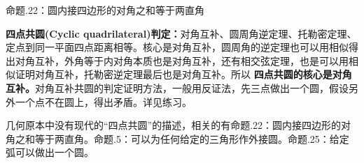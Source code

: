 \documentclass[../main.tex]{subfiles}
\begin{document}
命题\uppercase\expandafter{}.22：圆内接四边形的对角之和等于两直角

\textbf{四点共圆(Cyclic quadrilateral)判定：}对角互补、圆周角逆定理、托勒密定理、定点到同一平面四点距离相等。核心是对角互补，圆周角的逆定理也可以用相似得出对角互补，外角等于内对角本质也是对角互补，还有相交弦定理，也是可以用相似证明对角互补，托勒密逆定理最后也是对角互补。所以 \textbf{四点共圆的核心是对角互补。}对角互补共圆的判定证明方法，一般用反证法，先三点做出一个圆，假设另外一个点不在圆上，得出矛盾。详见练习。

几何原本中没有现代的“四点共圆”的描述，相关的有命题\uppercase\expandafter{}.22：圆内接四边形的对角之和等于两直角。命题\uppercase\expandafter{}.5：可以为任何给定的三角形作外接圆。命题\uppercase\expandafter{}.25：给定弧可以做出一个圆。
\end{document}
